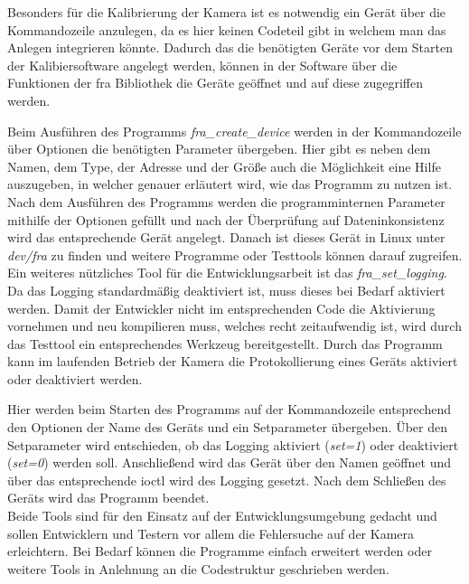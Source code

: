 Besonders für die Kalibrierung der Kamera ist es notwendig ein Gerät über die Kommandozeile anzulegen, da es hier keinen Codeteil gibt in welchem man das Anlegen integrieren könnte. Dadurch das die benötigten Geräte vor dem Starten der Kalibiersoftware angelegt werden, können in der Software über die Funktionen der \ac{fra} Bibliothek die Geräte geöffnet und auf diese zugegriffen werden.


Beim Ausführen des Programms \textit{fra\_create\_device} werden in der Kommandozeile über Optionen die benötigten Parameter übergeben. Hier gibt es neben dem Namen, dem Type, der Adresse und der Größe auch die Möglichkeit eine Hilfe auszugeben, in welcher genauer erläutert wird, wie das Programm zu nutzen ist. 
Nach dem Ausführen des Programms werden die programminternen Parameter mithilfe der Optionen gefüllt und nach der Überprüfung auf Dateninkonsistenz wird das entsprechende Gerät angelegt. 
Danach ist dieses Gerät in Linux unter \textit{dev/fra} zu finden und weitere Programme oder Testtools können darauf zugreifen.\\

Ein weiteres nützliches Tool für die Entwicklungsarbeit ist das \textit{fra\_set\_logging}. Da das Logging standardmäßig deaktiviert ist, muss dieses bei Bedarf aktiviert werden. Damit der Entwickler nicht im entsprechenden Code die Aktivierung vornehmen und neu kompilieren muss, welches recht zeitaufwendig ist, wird durch das Testtool ein entsprechendes Werkzeug bereitgestellt. Durch das Programm kann im laufenden Betrieb der Kamera die Protokollierung eines Geräts aktiviert oder deaktiviert werden.


Hier werden beim Starten des Programms auf der Kommandozeile entsprechend den Optionen der Name des Geräts und ein Setparameter übergeben. 
Über den Setparameter wird entschieden, ob das Logging aktiviert (\textit{set=1}) oder deaktiviert (\textit{set=0}) werden soll. Anschließend wird das Gerät über den Namen geöffnet und über das entsprechende \ac{ioctl} wird des Logging gesetzt. Nach dem Schließen des Geräts wird das Programm beendet. \\


Beide Tools sind für den Einsatz auf der Entwicklungsumgebung gedacht und sollen Entwicklern und Testern vor allem die Fehlersuche auf der Kamera erleichtern. Bei Bedarf können die Programme einfach erweitert werden oder weitere Tools in Anlehnung an die Codestruktur geschrieben werden. 